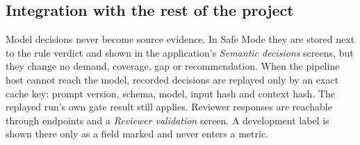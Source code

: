 \subsection{Integration with the rest of the project}

Model decisions never become source evidence. In Safe Mode they are stored next to the rule verdict and shown in the application's \emph{Semantic decisions} screens, but they change no demand, coverage, gap or recommendation. When the pipeline host cannot reach the model, recorded decisions are replayed only by an exact cache key: prompt version, schema, model, input hash and context hash. The replayed run's own gate result still applies. Reviewer responses are reachable through  endpoints and a \emph{Reviewer validation} screen. A development label is shown there only as a field marked  and never enters a metric.

